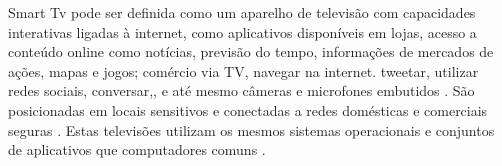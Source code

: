 
Smart Tv pode ser definida como um aparelho de televisão com capacidades interativas ligadas à internet, como aplicativos disponíveis em lojas, acesso a conteúdo online como notícias, previsão do tempo, informações de mercados de ações, mapas e jogos; comércio via TV, navegar na internet. tweetar, utilizar redes sociais, conversar,\cite{shin2013smart}, e até mesmo câmeras e microfones embutidos \cite{michele2014watch}. São posicionadas em locais sensitivos e conectadas a redes domésticas e comerciais seguras \cite{michele2014watch}. Estas televisões utilizam os mesmos sistemas operacionais e conjuntos de aplicativos que computadores comuns \cite{michele2014watch}. 
